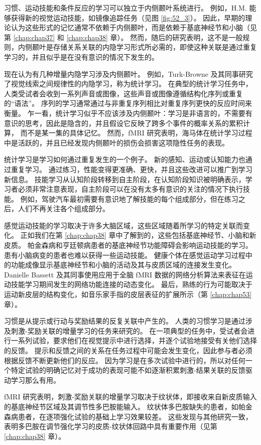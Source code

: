 习惯、运动技能和条件反应的学习可以独立于内侧颞叶系统进行。 例如，H.M. 能够获得新的视觉运动技能，如镜像追踪任务（见图 \ref{fig:52_3}）。 因此，早期的理论认为这些形式的记忆通常不依赖于内侧颞叶，而是依赖于基底神经节和小脑（见第 \ref{chap:chap37} 和 \ref{chap:chap38} 章）。 然而，随后的研究表明，这不是一般规则，内侧颞叶是存储关系关联的内隐学习形式所必需的，即使这种关联是通过重复学习的，并且似乎是在没有意识的情况下发生的。

现在认为有几种增量内隐学习涉及内侧颞叶。 例如，Turk-Browne 及其同事研究了视觉线索之间规律性的内隐学习，称为统计学习。 在典型的统计学习任务中，人类受试者会收到一系列声音或图像，这些声音或图像遵循结构化序列或重复的“语法”。 序列的学习通常通过与非重复序列相比对重复序列更快的反应时间来衡量。 乍一看，统计学习似乎不应该涉及内侧颞叶：学习是非语言的，不需要有意识的思考，因此是隐含的，并且假设它反映了跨多个事件的概率关系的累积计算， 而不是某一集的具体记忆。 然而，fMRI 研究表明，海马体在统计学习过程中是活跃的，并且已经发现内侧颞叶的损伤会损害这项隐性任务的表现。

统计学习是学习如何通过重复发生的一个例子。 新的感知、运动或认知能力也通过重复学习。 通过练习，性能变得更准确、更快，并且这些改进可以推广到学习新信息。 技能学习从认知阶段转移到自主阶段，在认知阶段知识被明确表示，学习者必须非常注意表现，自主阶段可以在没有太多有意识的关注的情况下执行技能。 例如，驾驶汽车最初需要有意识地了解技能的每个组成部分，但在练习之后，人们不再关注各个组成部分。

感觉运动技能的学习取决于许多大脑区域，这些区域随着所学习的特定关联而变化。 正如我们在第 \ref{chap:chap38} 章中了解到的，这些包括基底神经节、小脑和新皮质。 帕金森病和亨廷顿病患者的基底神经节功能障碍会影响运动技能的学习。 患有小脑病变的患者也难以获得一些运动技能。 健康个体在感觉运动学习过程中的功能成像显示基底神经节和小脑的活动及其与皮质区域的连接发生变化。 Danielle Bassett 及其同事使用应用于全脑 fMRI 数据的网络分析算法来表征在运动技能学习期间发生的网络功能连接的动态变化。 最后，熟练的行为可能取决于运动新皮层的结构变化，如音乐家手指的皮层表征的扩展所示（第 \ref{chap:chap53} 章）。

习惯是从提示或行动与奖励结果的反复关联中产生的。 人类的习惯学习是通过涉及刺激-奖励关联的增量学习的任务来研究的。 在一项典型的任务中，受试者会进行一系列试验，要求他们在视觉提示中进行选择，并逐个试验地接受有关他们选择的反馈。 提示和反馈之间的关系在任务过程中可能会发生变化，因此参与者必须根据反馈不断更新他们的反应。 因为学习是在多次试验中进行的，所以对任何一个特定试验的明确记忆对于成功的表现可能不如逐渐积累刺激-结果关联的反馈驱动学习那么有用。

fMRI 研究表明，刺激-奖励关联的增量学习取决于纹状体，即接收来自新皮质输入的基底神经节区域及其调节性多巴胺能输入。 纹状体多巴胺缺失的患者，如帕金森病患者，在逐项强化试验的基础上学习效果较差。 这些发现与其他研究一致，表明多巴胺在调节强化学习的皮质-纹状体回路中具有重要作用（见第 \ref{chap:chap38} 章）。

